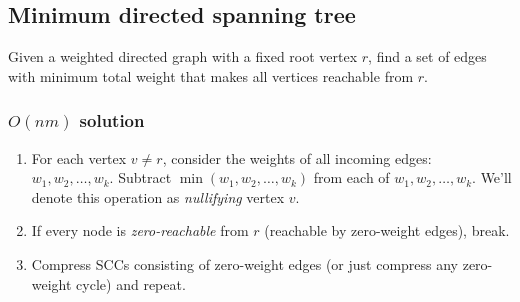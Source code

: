 \subsection{Minimum directed spanning tree}
Given a weighted directed graph with a fixed root vertex $r$, find a set of edges with minimum total weight that makes all vertices reachable from $r$.

\subsubsection*{$O(nm)$ solution}
\begin{enumerate}
\item For each vertex $v \ne r$, consider the weights of all incoming edges: $w_1, w_2, \ldots, w_k$. Subtract $\min(w_1, w_2, \ldots, w_k)$ from each of $w_1, w_2, \ldots, w_k$. We'll denote this operation as \textit{nullifying} vertex $v$.
\item If every node is \textit{zero-reachable} from $r$ (reachable by zero-weight edges), break.
\item Compress SCCs consisting of zero-weight edges (or just compress any zero-weight cycle) and repeat.
\end{enumerate}

